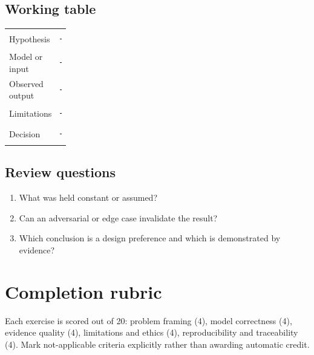 \documentclass[11pt]{article}
\begin{document}
\subsection{Working table}
\begin{tabularx}{\linewidth}{@{}p{0.20\linewidth}X@{}}\toprule
Hypothesis & \rule{0.90\linewidth}{0.4pt}\\[0.35cm]
Model or input & \rule{0.90\linewidth}{0.4pt}\\[0.35cm]
Observed output & \rule{0.90\linewidth}{0.4pt}\\[0.35cm]
Limitations & \rule{0.90\linewidth}{0.4pt}\\[0.35cm]
Decision & \rule{0.90\linewidth}{0.4pt}\\\bottomrule\end{tabularx}

\subsection{Review questions}
\begin{enumerate}
\item What was held constant or assumed?
\item Can an adversarial or edge case invalidate the result?
\item Which conclusion is a design preference and which is demonstrated by evidence?
\end{enumerate}

\section{Completion rubric}
Each exercise is scored out of 20: problem framing (4), model correctness (4), evidence quality (4), limitations and ethics (4), reproducibility and traceability (4). Mark not-applicable criteria explicitly rather than awarding automatic credit.
\end{document}
